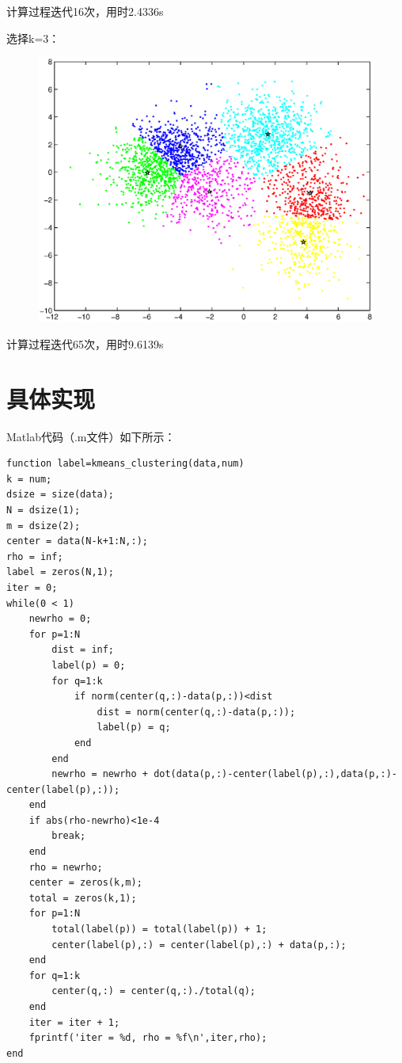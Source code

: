 \documentclass[UTF8]{ctexart}
\begin{document}
\par
计算过程迭代16次，用时2.4336s\par
选择k=3：\par
\begin{figure}[h]
  \centering
  \includegraphics[width=1.05\textwidth]{kmeans6.eps}
\end{figure}
\par
计算过程迭代65次，用时9.6139s\par

\section{具体实现}
Matlab代码（.m文件）如下所示：\par
\begin{lstlisting}
function label=kmeans_clustering(data,num)
k = num;
dsize = size(data);
N = dsize(1);
m = dsize(2);
center = data(N-k+1:N,:);
rho = inf;
label = zeros(N,1);
iter = 0;
while(0 < 1)
    newrho = 0;
    for p=1:N
        dist = inf;
        label(p) = 0;
        for q=1:k
            if norm(center(q,:)-data(p,:))<dist
                dist = norm(center(q,:)-data(p,:));
                label(p) = q;
            end
        end
        newrho = newrho + dot(data(p,:)-center(label(p),:),data(p,:)-center(label(p),:));
    end
    if abs(rho-newrho)<1e-4
        break;
    end
    rho = newrho;
    center = zeros(k,m);
    total = zeros(k,1);
    for p=1:N
        total(label(p)) = total(label(p)) + 1;
        center(label(p),:) = center(label(p),:) + data(p,:);
    end
    for q=1:k
        center(q,:) = center(q,:)./total(q);
    end
    iter = iter + 1;
    fprintf('iter = %d, rho = %f\n',iter,rho);
end
\end{lstlisting}
\end{document}
